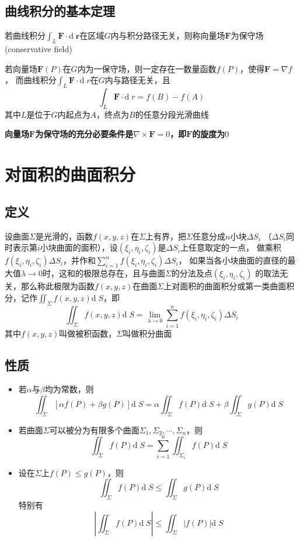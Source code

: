 \documentclass[UTF8]{ctexart}
\newcommand{\cross}{\times}
\newcommand{\dif}[1]{{\mathrm{d}\;\!#1}}
\newcommand{\ve}[1]{{\bm{#1}}}
\newcommand{\abs}[1]{{\left|{#1}\right|}}
\newcommand{\emplin}{\vspace{1em}}
\begin{document}
\subsection*{曲线积分的基本定理}
若曲线积分$\int_L\ve{F}\cdot\dif{\ve{r}}$在区域$G$内与积分路径无关，则称向量场$\ve{F}$为保守场(conservative field)

\emplin

若向量场$\ve{F}(P)$在$G$内为一保守场，则一定存在一数量函数$f(P)$，使得$\ve{F}=\nabla f$，
而曲线积分$\int_L\ve{F}\cdot\dif{r}$在$G$内与路径无关，且
\[\int_L\ve{F}\cdot\dif{r}=f(B)-f(A)\]
其中$L$是位于$G$内起点为$A$，终点为$B$的任意分段光滑曲线

\emplin

\textbf{向量场$\ve{F}$为保守场的充分必要条件是$\nabla\cross\ve{F}=0$，即$\ve{F}$的旋度为$0$}

\section*{对面积的曲面积分}
\subsection*{定义}
设曲面$\Sigma$是光滑的，函数$f(x,y,z)$在$\Sigma$上有界，把$\Sigma$任意分成$n$小块$\Delta S_i$
（$\Delta S_i$同时表示第$i$小块曲面的面积），设$(\xi_i,\eta_i,\zeta_i)$是$\Delta S_i$上任意取定的一点，
做乘积$f(\xi_i,\eta_i,\zeta_i)\Delta S_i$，并作和$\sum^n_{i=1}f(\xi_i,\eta_i,\zeta_i)\Delta S_i$，
如果当各小块曲面的直径的最大值$\lambda\to0$时，这和的极限总存在，且与曲面$\Sigma$的分法及点$(\xi_i,\eta_i,\zeta_i)$
的取法无关，那么称此极限为函数$f(x,y,z)$在曲面$\Sigma$上对面积的曲面积分或第一类曲面积分，记作$\iint_\Sigma f(x,y,z)\dif{S}$，即
\[\iint_\Sigma f(x,y,z)\dif{S}=\lim_{\lambda\to0}\sum^n_{i=1}f(\xi_i,\eta_i,\zeta_i)\Delta S_i\]
其中$f(x,y,z)$叫做被积函数，$\Sigma$叫做积分曲面

\subsection*{性质}
\begin{itemize}
  \item 若$\alpha$与$\beta$均为常数，则
  \[\iint_\Sigma[\alpha f(P)+\beta g(P)]\dif{S}=\alpha\iint_\Sigma f(P)\dif{S}+\beta\iint_\Sigma g(P)\dif{S}\]
  \item 若曲面$\Sigma$可以被分为有限多个曲面$\Sigma_1,\Sigma_2,\cdots,\Sigma_n$，则
  \[ \iint_\Sigma f(P)\dif{S}=\sum^n_{i=1}\iint_{\Sigma_i}f(P)\dif{S} \]
  \item 设在$\Sigma$上$f(P)\le g(P)$，则
  \[\iint_\Sigma f(P)\dif{S}\le\iint_\Sigma g(P)\dif{S}\]
  特别有
  \[\abs{\iint_\Sigma f(P)\dif{S}}\le\iint_\Sigma \abs{f(P)}\dif{S}\]
\end{itemize}
\end{document}
